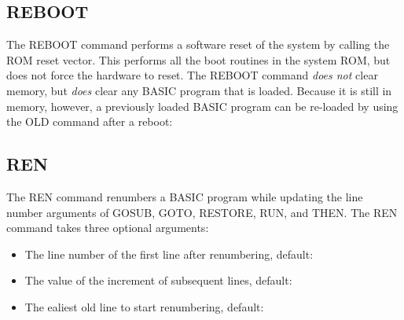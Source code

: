 \subsection{REBOOT}

The {\ttfamily REBOOT} command performs a software reset of the system by
calling the ROM reset vector.  This performs all the boot routines in the
system ROM, but does not force the hardware to reset.  The {\ttfamily REBOOT}
command {\em does not} clear memory, but {\em does} clear any BASIC program
that is loaded.  Because it is still in memory, however, a previously loaded
BASIC program can be re-loaded by using the {\ttfamily OLD} command after a
reboot:\\


\subsection{REN}

The {\ttfamily REN} command renumbers a BASIC program while updating the line
number arguments of {\ttfamily GOSUB}, {\ttfamily GOTO}, {\ttfamily RESTORE},
{\ttfamily RUN}, and {\ttfamily THEN}.  The {\ttfamily REN} command takes three
optional arguments:\\

\begin{itemize}

	\item The line number of the first line after renumbering, default: {}

	\item The value of the increment of subsequent lines, default: {}

	\item The ealiest old line to start renumbering, default: {}

\end{itemize}

